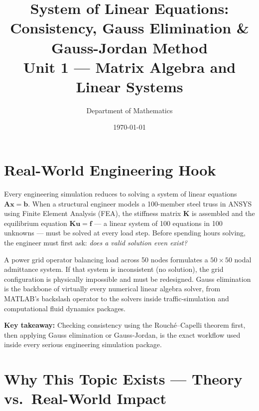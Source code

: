 \documentclass[12pt,a4paper]{article}
\title{\textbf{System of Linear Equations: Consistency, Gauss Elimination \& Gauss-Jordan Method} \\ \large Unit 1 --- Matrix Algebra and Linear Systems}
\author{Department of Mathematics}
\date{\today}
\begin{document}
\maketitle
\tableofcontents
\newpage

\section{Real-World Engineering Hook}

\begin{curiositybox}
Every engineering simulation reduces to solving a system of linear equations \(\mathbf{A}\mathbf{x} = \mathbf{b}\).
When a structural engineer models a 100-member steel truss in ANSYS using Finite Element Analysis (FEA),
the stiffness matrix \(\mathbf{K}\) is assembled and the equilibrium equation \(\mathbf{K}\mathbf{u} = \mathbf{f}\)
--- a linear system of 100 equations in 100 unknowns --- must be solved at every load step.
Before spending hours solving, the engineer must first ask: \textit{does a valid solution even exist?}

A power grid operator balancing load across 50 nodes formulates a $50 \times 50$ nodal admittance system.
If that system is inconsistent (no solution), the grid configuration is physically impossible and must
be redesigned. Gauss elimination is the backbone of virtually every numerical linear algebra solver,
from MATLAB's backslash operator to the solvers inside traffic-simulation and computational fluid
dynamics packages.

\textbf{Key takeaway:} Checking consistency using the Rouch\'{e}--Capelli theorem first, then applying
Gauss elimination or Gauss-Jordan, is the exact workflow used inside every serious engineering
simulation package.
\end{curiositybox}

\section{Why This Topic Exists --- Theory vs.\ Real-World Impact}
\end{document}

